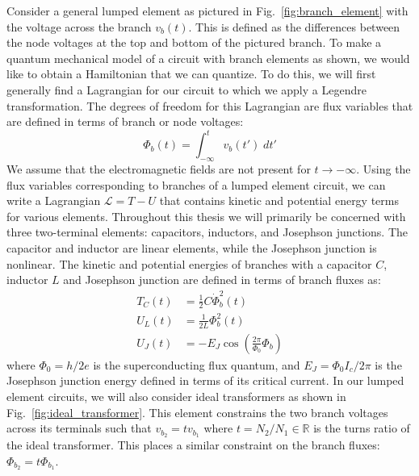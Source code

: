 Consider a general lumped element as pictured in Fig.\ \ref{fig:branch_element} with the voltage across the branch $v_b(t)$. This is defined as the differences between the node voltages at the top and bottom of the pictured branch. To make a quantum mechanical model of a circuit with branch elements as shown, we would like to obtain a Hamiltonian that we can quantize. To do this, we will first generally find a Lagrangian for our circuit to which we apply a Legendre transformation. The degrees of freedom for this Lagrangian are flux variables that are defined in terms of branch or node voltages:
\begin{equation}
    \Phi_b(t) = \int_{-\infty}^t v_b(t')\; dt'
\end{equation}
We assume that the electromagnetic fields are not present for $t \rightarrow -\infty$. Using the flux variables corresponding to branches of a lumped element circuit, we can write a Lagrangian $\mathcal{L} = T - U$ that contains kinetic and potential energy terms for various elements. Throughout this thesis we will primarily be concerned with three two-terminal elements: capacitors, inductors, and Josephson junctions. The capacitor and inductor are linear elements, while the Josephson junction is nonlinear. The kinetic and potential energies of branches with a capacitor $C$, inductor $L$ and Josephson junction are defined in terms of branch fluxes as:
\begin{align}
    T_C(t) &= \frac{1}{2}C\dot{\Phi}_b^2(t) \\
    U_L(t) &= \frac{1}{2L}\Phi_b^2(t) \\ 
    U_J(t) &= -E_J \cos(\frac{2\pi}{\Phi_0} \Phi_b)
\end{align}
where $\Phi_0=h/2e$ is the superconducting flux quantum, and $E_J=\Phi_0 I_c/2\pi$ is the Josephson junction energy defined in terms of its critical current. In our lumped element circuits, we will also consider ideal transformers as shown in Fig.\ \ref{fig:ideal_transformer}. This element constrains the two branch voltages across its terminals such that $v_{b_2} = tv_{b_1}$ where $t=N_2/N_1 \in \mathbb{R}$ is the turns ratio of the ideal transformer. This places a similar constraint on the branch fluxes: $\Phi_{b_2} = t\Phi_{b_1}$.

